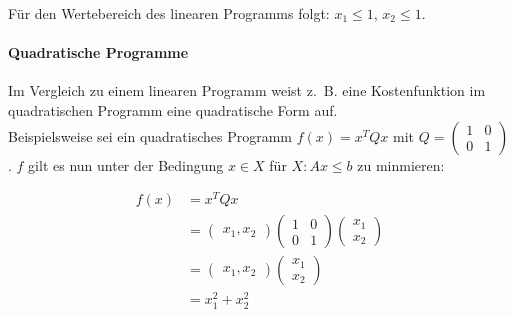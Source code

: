 Für den Wertebereich des linearen Programms folgt: $x_{1} \le 1$, $x_{2} \le 1$.

\paragraph{Quadratische Programme}

Im Vergleich zu einem linearen Programm weist z.~B. eine Kostenfunktion im quadratischen Programm eine quadratische Form auf. \\
Beispielsweise sei ein quadratisches Programm $f(x) = x^{T}Qx$ mit $Q = \begin{pmatrix}1 & 0 \\ 0 & 1 \end{pmatrix}$. $f$ gilt es nun unter der Bedingung $x \in X$ für $X: Ax \le b$ zu minmieren:

\begin{align*}
f(x) &= x^{T}Qx \\
&= \begin{pmatrix}x_{1}, x_{2}\end{pmatrix} \begin{pmatrix}1 & 0 \\ 0 & 1\end{pmatrix} \begin{pmatrix}x_{1} \\ x_{2}\end{pmatrix} \\
&= \begin{pmatrix}x_{1}, x_{2}\end{pmatrix} \begin{pmatrix}x_{1} \\ x_{2}\end{pmatrix} \\
&= x_{1}^{2} + x_{2}^{2}
\end{align*}